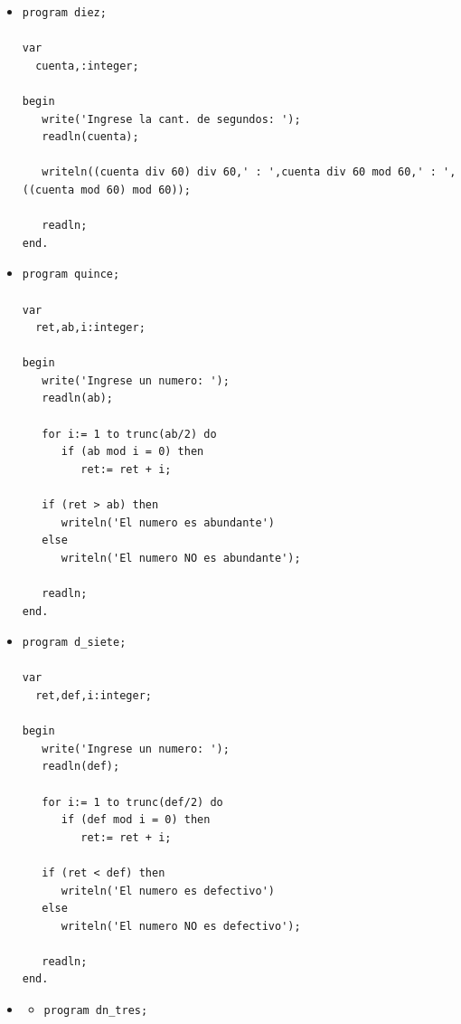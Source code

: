 \documentclass[a4paper,10pt]{article}
\begin{document}
\begin{itemize}
\begin{small}
\begin{verbatim}
   readln;
end.
\end{verbatim}
\end{small}

\item[10]
\begin{small}
\begin{verbatim}
program diez;

var
  cuenta,:integer;

begin
   write('Ingrese la cant. de segundos: ');
   readln(cuenta);

   writeln((cuenta div 60) div 60,' : ',cuenta div 60 mod 60,' : ',((cuenta mod 60) mod 60));

   readln;
end.
\end{verbatim}
\end{small}
\item[15]
\begin{small}
\begin{verbatim}
program quince;

var
  ret,ab,i:integer;

begin
   write('Ingrese un numero: ');
   readln(ab);

   for i:= 1 to trunc(ab/2) do
      if (ab mod i = 0) then
         ret:= ret + i;

   if (ret > ab) then
      writeln('El numero es abundante')
   else
      writeln('El numero NO es abundante');

   readln;
end.
\end{verbatim}
\end{small}
\item[17]
\begin{small}
\begin{verbatim}
program d_siete;

var
  ret,def,i:integer;

begin
   write('Ingrese un numero: ');
   readln(def);

   for i:= 1 to trunc(def/2) do
      if (def mod i = 0) then
         ret:= ret + i;

   if (ret < def) then
      writeln('El numero es defectivo')
   else
      writeln('El numero NO es defectivo');

   readln;
end.
\end{verbatim}
\end{small}
\item[19]
    \begin{itemize}
      \item[3]
\begin{small}
\begin{verbatim}
program dn_tres;


\end{verbatim}
\end{small}
\end{itemize}
\end{itemize}
\end{document}
